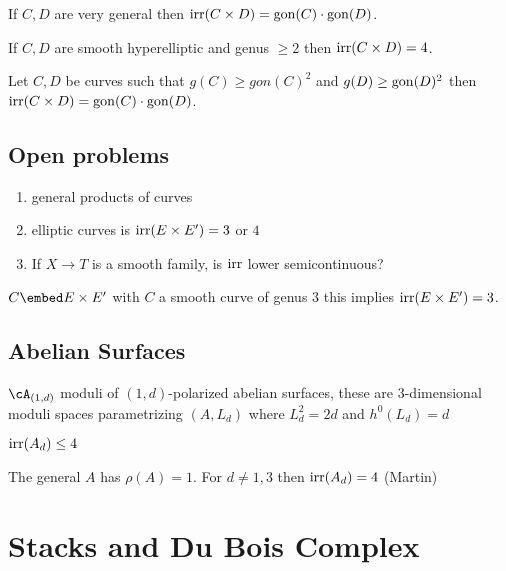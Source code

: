 \documentclass[12pt]{article}
\begin{document}
\begin{conj}[C-Martin]
If $C,D$ are very general then $\mathrm{irr}(C \times D) = \mathrm{gon}(C) \cdot \mathrm{gon}(D)$.
\end{conj}

\begin{theorem}[C-Martin]
If $C, D$ are smooth hyperelliptic and genus $\ge 2$ then $\mathrm{irr}(C \times D) = 4$. 
\end{theorem}

\begin{theorem}
Let $C, D$ be curves such that $g(C) \ge gon(C)^2$ and $g(D) \ge \mathrm{gon}(D)^2$ then $\mathrm{irr}(C \times D) = \mathrm{gon}(C) \cdot \mathrm{gon}(D)$.
\end{theorem}

\subsection{Open problems}

\begin{enumerate}
\item general products of curves
\item elliptic curves is $\mathrm{irr}(E \times E') = 3$ or $4$
\item If $X \to T$ is a smooth family, is $\mathrm{irr}$ lower semicontinuous? 
\end{enumerate}

\begin{example}[Yoshihara]
$C \embed E \times E'$ with $C$ a smooth curve of genus $3$ this implies $\mathrm{irr}(E \times E') = 3$.
\end{example}

\subsection{Abelian Surfaces}

$\cA_{(1,d)}$ moduli of $(1,d)$-polarized abelian surfaces, these are $3$-dimensional moduli spaces parametrizing $(A, L_d)$ where $L_d^2 = 2d$ and $h^0(L_d) = d$

\begin{theorem}[C-Stapleton]
$\mathrm{irr}(A_d) \le 4$
\end{theorem}

The general $A$ has $\rho(A) = 1$. For $d \neq 1,3$ then $\mathrm{irr}(A_d) = 4$ (Martin) 


\section{Stacks and Du Bois Complex}
\end{document}
